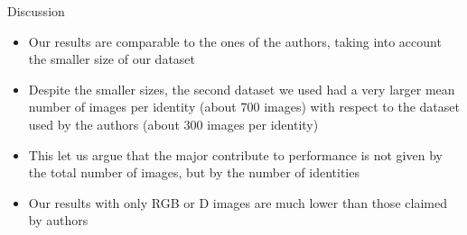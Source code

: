 \documentclass[unknownkeysallowed]{beamer}
\begin{document}
\begin{frame}{Discussion}
	\begin{itemize}
		\item Our results are comparable to the ones of the authors, taking into account the smaller size of our	dataset
		\item Despite the smaller sizes, the second dataset we used had a very larger mean number of images per identity (about 700 images) with respect to the dataset used by the authors (about 300 images per identity)
		\item This let us argue that the major contribute to performance is not given by the total number of images, but by the number of identities
		\item Our results with only RGB or D images are much lower than	those claimed by authors
	\end{itemize}
\end{frame}
\end{document}
